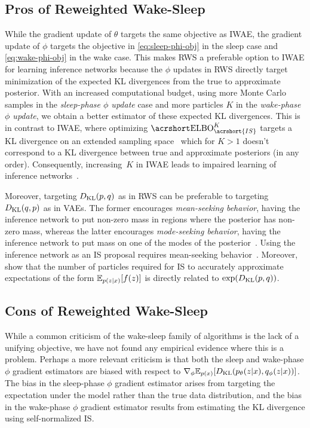 \subsection{Pros of Reweighted Wake-Sleep}

While the gradient update of $\theta$ targets the same objective as \gls{IWAE}, the gradient update of $\phi$ targets the objective in \cref{eq:sleep-phi-obj} in the sleep case and \cref{eq:wake-phi-obj} in the wake case.
This makes \gls{RWS} a preferable option to \gls{IWAE} for learning inference networks because
the $\phi$ updates in \gls{RWS} directly target minimization of the expected \gls{KL} divergences from the true to approximate posterior.
%
With an increased computational budget, using more Monte Carlo samples in the \emph{sleep-phase $\phi$ update} case and more particles $K$ in the \emph{wake-phase $\phi$ update}, we obtain a better estimator of these expected \gls{KL} divergences.
%
This is in contrast to \gls{IWAE}, where optimizing $\ELBO_{\acrshort{IS}}^K$ targets a \gls{KL} divergence on an extended sampling space~\citep{le2018autoencoding} which for $K > 1$ doesn't correspond to a \gls{KL} divergence between true and approximate posteriors (in any order).
%
Consequently, increasing~\(K\) in \gls{IWAE} leads to impaired learning of inference networks~\citep{rainforth2018tighter}.

Moreover, targeting $D_{\mathrm{KL}}(p, q)$ as in \gls{RWS} can be preferable to targeting $D_{\mathrm{KL}}(q, p)$ as in \glspl{VAE}.
%
The former encourages \emph{mean-seeking behavior}, having the inference network to put non-zero mass in regions where the posterior has non-zero mass, whereas the latter encourages \emph{mode-seeking behavior}, having the inference network to put mass on one of the modes of the posterior~\citep{minka2005divergence}.
%
Using the inference network as an \gls{IS} proposal requires mean-seeking behavior~\citep[Theorem 9.2]{owen2013monte}.
%
Moreover, \citet{chatterjee2018sample} show that the number of particles required for \gls{IS} to accurately approximate expectations of the form $\mathbb{E}_{p(z \lvert x)}[f(z)]$ is directly related to $\exp(D_{\mathrm{KL}}(p, q))$.

\subsection{Cons of Reweighted Wake-Sleep}
\label{sec:disadvantages}

While a common criticism of the wake-sleep family of algorithms is the lack of a unifying objective, we have not found any empirical evidence where this is a problem.
%
Perhaps a more relevant criticism is that both the sleep and wake-phase $\phi$ gradient estimators are biased with respect to $\nabla_\phi \mathbb{E}_{p(x)}[D_{\mathrm{KL}}(p_\theta(z \lvert x), q_\phi(z \lvert x))]$.
%
The bias in the sleep-phase $\phi$ gradient estimator arises from targeting the expectation under the model rather than the true data distribution, and the bias in the wake-phase $\phi$ gradient estimator results from estimating the \gls{KL} divergence using self-normalized \gls{IS}.

